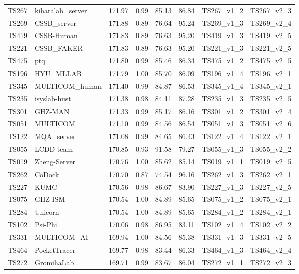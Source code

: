 \begin{longtable}{llllllll}
TS267 & kiharalab\_server & 171.97 & 0.99 & 85.13 & 86.84 & TS267\_v1\_2 & TS267\_v2\_3 \\ 
TS269 & CSSB\_server & 171.88 & 0.89 & 76.64 & 95.24 & TS269\_v1\_3 & TS269\_v2\_4 \\ 
TS419 & CSSB-Human & 171.83 & 0.89 & 76.63 & 95.20 & TS419\_v1\_3 & TS419\_v2\_5 \\ 
TS221 & CSSB\_FAKER & 171.83 & 0.89 & 76.63 & 95.20 & TS221\_v1\_3 & TS221\_v2\_5 \\ 
TS475 & ptq & 171.80 & 0.99 & 85.46 & 86.34 & TS475\_v1\_2 & TS475\_v2\_5 \\ 
TS196 & HYU\_MLLAB & 171.79 & 1.00 & 85.70 & 86.09 & TS196\_v1\_4 & TS196\_v2\_1 \\ 
TS345 & MULTICOM\_human & 171.40 & 0.99 & 84.87 & 86.53 & TS345\_v1\_4 & TS345\_v2\_1 \\ 
TS235 & isyslab-hust & 171.38 & 0.98 & 84.11 & 87.28 & TS235\_v1\_3 & TS235\_v2\_5 \\ 
TS301 & GHZ-MAN & 171.33 & 0.99 & 85.17 & 86.16 & TS301\_v1\_2 & TS301\_v2\_4 \\ 
TS051 & MULTICOM & 171.10 & 0.99 & 84.56 & 86.54 & TS051\_v1\_3 & TS051\_v2\_6 \\ 
TS122 & MQA\_server & 171.08 & 0.99 & 84.65 & 86.43 & TS122\_v1\_4 & TS122\_v2\_1 \\ 
TS055 & LCDD-team & 170.85 & 0.93 & 91.58 & 79.27 & TS055\_v1\_3 & TS055\_v2\_2 \\ 
TS019 & Zheng-Server & 170.76 & 1.00 & 85.62 & 85.14 & TS019\_v1\_1 & TS019\_v2\_5 \\ 
TS262 & CoDock & 170.70 & 0.87 & 74.54 & 96.16 & TS262\_v1\_3 & TS262\_v2\_1 \\ 
TS227 & KUMC & 170.56 & 0.98 & 86.67 & 83.90 & TS227\_v1\_3 & TS227\_v2\_5 \\ 
TS075 & GHZ-ISM & 170.54 & 1.00 & 84.89 & 85.65 & TS075\_v1\_2 & TS075\_v2\_1 \\ 
TS284 & Unicorn & 170.54 & 1.00 & 84.89 & 85.65 & TS284\_v1\_2 & TS284\_v2\_1 \\ 
TS102 & Psi-Phi & 170.06 & 0.98 & 86.95 & 83.11 & TS102\_v1\_4 & TS102\_v2\_2 \\ 
TS331 & MULTICOM\_AI & 169.94 & 1.00 & 84.56 & 85.38 & TS331\_v1\_3 & TS331\_v2\_5 \\ 
TS464 & PocketTracer & 169.77 & 0.98 & 83.44 & 86.33 & TS464\_v1\_3 & TS464\_v2\_4 \\ 
TS272 & GromihaLab & 169.71 & 0.99 & 83.67 & 86.04 & TS272\_v1\_1 & TS272\_v2\_3 \\ 

\end{longtable}
